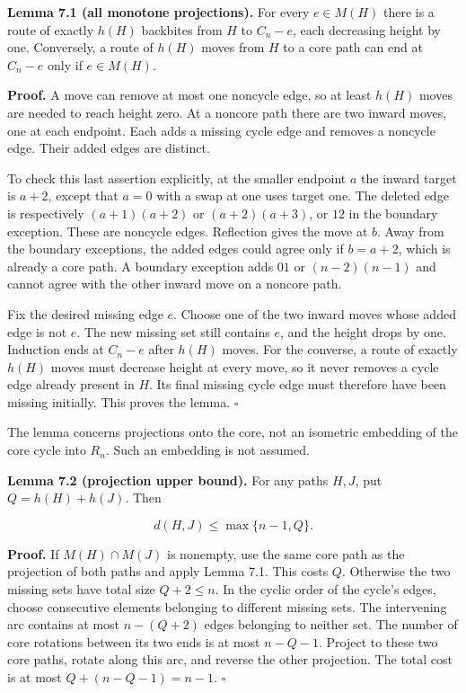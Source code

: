 \documentclass[11pt,a4paper]{article}
\begin{document}
\textbf{Lemma 7.1 (all monotone projections).} For every \(e\in M(H)\) there is a route of exactly \(h(H)\) backbites from \(H\) to \(C_n-e\), each decreasing height by one. Conversely, a route of \(h(H)\) moves from \(H\) to a core path can end at \(C_n-e\) only if \(e\in M(H)\).

\textbf{Proof.} A move can remove at most one noncycle edge, so at least \(h(H)\) moves are needed to reach height zero. At a noncore path there are two inward moves, one at each endpoint. Each adds a missing cycle edge and removes a noncycle edge. Their added edges are distinct.

To check this last assertion explicitly, at the smaller endpoint \(a\) the inward target is \(a+2\), except that \(a=0\) with a swap at one uses target one. The deleted edge is respectively \((a+1)(a+2)\) or \((a+2)(a+3)\), or \(12\) in the boundary exception. These are noncycle edges. Reflection gives the move at \(b\). Away from the boundary exceptions, the added edges could agree only if \(b=a+2\), which is already a core path. A boundary exception adds \(01\) or \((n-2)(n-1)\) and cannot agree with the other inward move on a noncore path.

Fix the desired missing edge \(e\). Choose one of the two inward moves whose added edge is not \(e\). The new missing set still contains \(e\), and the height drops by one. Induction ends at \(C_n-e\) after \(h(H)\) moves. For the converse, a route of exactly \(h(H)\) moves must decrease height at every move, so it never removes a cycle edge already present in \(H\). Its final missing cycle edge must therefore have been missing initially. This proves the lemma. \(\square\)

The lemma concerns projections onto the core, not an isometric embedding of the core cycle into \(R_n\). Such an embedding is not assumed.

\textbf{Lemma 7.2 (projection upper bound).} For any paths \(H,J\), put \(Q=h(H)+h(J)\). Then

\[ d(H,J)\le\max\{n-1,Q\}. \tag{5} \]

\textbf{Proof.} If \(M(H)\cap M(J)\) is nonempty, use the same core path as the projection of both paths and apply Lemma 7.1. This costs \(Q\). Otherwise the two missing sets have total size \(Q+2\le n\). In the cyclic order of the cycle's edges, choose consecutive elements belonging to different missing sets. The intervening arc contains at most \(n-(Q+2)\) edges belonging to neither set. The number of core rotations between its two ends is at most \(n-Q-1\). Project to these two core paths, rotate along this arc, and reverse the other projection. The total cost is at most \(Q+(n-Q-1)=n-1\). \(\square\)
\end{document}
